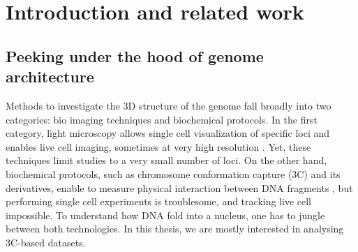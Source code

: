 

\chapter{Introduction and related work}

\graphicspath{{1_introduction/}}

\begin{abstract}{Résumé}

L'architecture spatiale et temporelle du génome joue un rôle important dans
beaucoup de fonctions génomiques, mais est cependant à l'heure actuelle peu
comprise. Le développement récent du protocol Hi-C, qui permet en une seule
expérience de mesurer les fréquences d'interactions entre paire de loci sur
tout le génome, ouvre la porte à une étude plus systématique de la structure
tridimensionnelle du génome. Dans ce chapitre, nous introduisons les concepts
sous-jacents à la capture de la conformation des chromosomes, la structure de
l'ADN et aux méthodes d'inférence de l'architecture 3D du génome.

\end{abstract}

\begin{abstract}{Abstract}

The spatial and temporal genome architecture is thought to play an important
role in many genomic functions, but is yet poorly understood. Recently, the
development of the Hi-C protocol, which allows in a single experiments to
assess genome wide physical interactions between pairs of loci, has paved the
way for a systematic analysis of the 3D structure of DNA. We aim in this
chapter at providing some background on chromosome conformation capture, the
structure of DNA and the field of 3D architecture inference.

\end{abstract}


\section{Peeking under the hood of genome architecture}

Methods to investigate the 3D structure of the genome fall broadly into two
categories: bio imaging techniques and biochemical protocols. In the first
category, light microscopy allows single cell visualization of specific loci
and enables live cell imaging, sometimes at very high resolution
\citep{cremer:chromosome-2010}. Yet, these techniques limit studies to a very
small number of loci. On the other hand, biochemical protocols, such as
chromosome conformation capture (3C) and its derivatives, enable to measure
physical interaction between DNA fragments \citep{dekker:capturing}, but
performing single cell experiments is troublesome, and tracking live cell
impossible. To understand how DNA fold into a nucleus, one has to jungle
between both technologies. In this thesis, we are mostly interested in
analysing 3C-based datasets.

